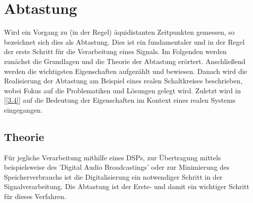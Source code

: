 \section{Abtastung}\label{3}
Wird ein Vorgang zu (in der Regel) äquidistanten Zeitpunkten gemessen, so bezeichnet sich dies als Abtastung. Dies ist ein fundamentaler und in der Regel der erste Schritt für die Verarbeitung eines Signals. Im Folgenden werden zunächst die Grundlagen und die Theorie der Abtastung erörtert. Anschließend werden die wichtigsten Eigenschaften aufgezählt und bewiesen. Danach wird die Realisierung der Abtastung am Beispiel eines realen Schaltkreises beschrieben, wobei Fokus auf die Problematiken und Lösungen gelegt wird. Zuletzt wird in [\ref{3.4}] auf die Bedeutung der Eigenschaften im Kontext eines realen Systems eingegangen.
\subsection{Theorie}\label{3.1}
Für jegliche Verarbeitung mithilfe eines DSPs, zur Übertragung mittels beispielsweise des 'Digital Audio Broadcastings' oder zur Minimierung des Speicherverbrauchs ist die Digitalisierung ein notwendiger Schritt in der Signalverarbeitung. Die Abtastung ist der Erste- und damit ein wichtiger Schritt für dieses Verfahren.

